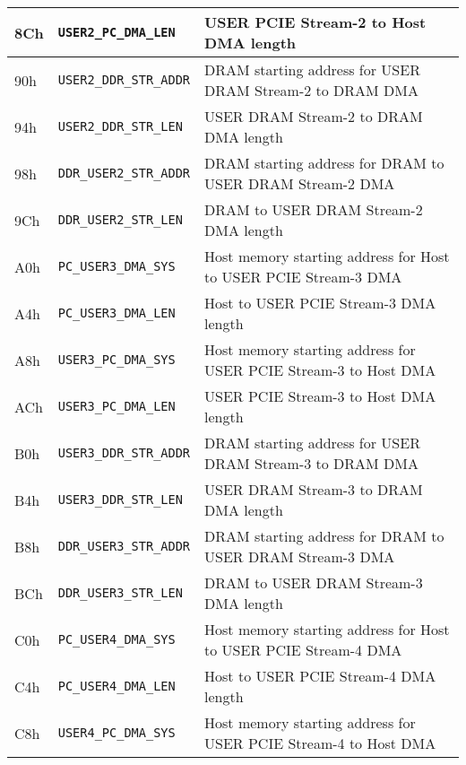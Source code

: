 \begin{longtable}{|l|l|p{9cm}|}
    8Ch          &  {\texttt{USER2\_PC\_DMA\_LEN  }}           &  USER PCIE Stream-2 to Host DMA length    \\\hline    
    90h          &  {\texttt{USER2\_DDR\_STR\_ADDR}}           &  DRAM starting address for USER DRAM Stream-2 to DRAM DMA     \\\hline    
    94h          &  {\texttt{USER2\_DDR\_STR\_LEN }}           &  USER DRAM Stream-2 to DRAM DMA length    \\\hline    
    98h          &  {\texttt{DDR\_USER2\_STR\_ADDR}}           &  DRAM starting address for DRAM to USER DRAM Stream-2 DMA    \\\hline    
    9Ch          &  {\texttt{DDR\_USER2\_STR\_LEN }}           &  DRAM to USER DRAM Stream-2 DMA length    \\\hline    
    A0h          &  {\texttt{PC\_USER3\_DMA\_SYS  }}           &  Host memory starting address for Host to USER PCIE Stream-3 DMA    \\\hline
    A4h          &  {\texttt{PC\_USER3\_DMA\_LEN  }}           &  Host to USER PCIE Stream-3 DMA length \\\hline
    A8h          &  {\texttt{USER3\_PC\_DMA\_SYS  }}           &  Host memory starting address for USER PCIE Stream-3 to Host DMA    \\\hline
    ACh          &  {\texttt{USER3\_PC\_DMA\_LEN  }}           &  USER PCIE Stream-3 to Host DMA length    \\\hline
    B0h          &  {\texttt{USER3\_DDR\_STR\_ADDR}}           &  DRAM starting address for USER DRAM Stream-3 to DRAM DMA     \\\hline
    B4h          &  {\texttt{USER3\_DDR\_STR\_LEN }}           &  USER DRAM Stream-3 to DRAM DMA length    \\\hline
    B8h          &  {\texttt{DDR\_USER3\_STR\_ADDR}}           &  DRAM starting address for DRAM to USER DRAM Stream-3 DMA    \\\hline
    BCh          &  {\texttt{DDR\_USER3\_STR\_LEN }}           &  DRAM to USER DRAM Stream-3 DMA length    \\\hline
    C0h          &  {\texttt{PC\_USER4\_DMA\_SYS  }}           &  Host memory starting address for Host to USER PCIE Stream-4 DMA    \\\hline
    C4h          &  {\texttt{PC\_USER4\_DMA\_LEN  }}           &  Host to USER PCIE Stream-4 DMA length \\\hline
    C8h          &  {\texttt{USER4\_PC\_DMA\_SYS  }}           &  Host memory starting address for USER PCIE Stream-4 to Host DMA    \\\hline

\end{longtable}
